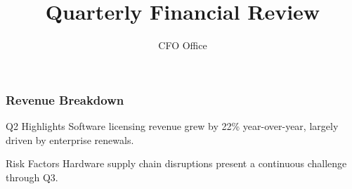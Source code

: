 \documentclass{beamer}
\title{Quarterly Financial Review}
\author{CFO Office}
\begin{document}
\begin{frame}
\titlepage
\end{frame}
\begin{frame}
\frametitle{Revenue Breakdown}
\begin{block}{Q2 Highlights}
Software licensing revenue grew by 22\% year-over-year, largely driven by enterprise renewals.
\end{block}
\begin{alertblock}{Risk Factors}
Hardware supply chain disruptions present a continuous challenge through Q3.
\end{alertblock}
\end{frame}
\end{document}
